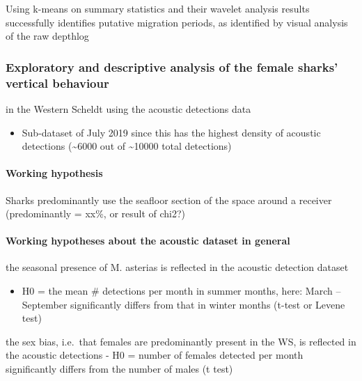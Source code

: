 \documentclass[
  authoryear,
  review,
  3p]{elsarticle}
\let\oldparagraph\paragraph
\renewcommand{\paragraph}[1]{\oldparagraph{#1}\mbox{}}
\providecommand{\tightlist}{%
  \setlength{\itemsep}{0pt}\setlength{\parskip}{0pt}}\usepackage{longtable,booktabs,array}
\begin{document}
Using k-means on summary statistics and their wavelet analysis results
successfully identifies putative migration periods, as identified by
visual analysis of the raw depthlog

\hypertarget{exploratory-and-descriptive-analysis-of-the-female-sharks-vertical-behaviour}{%
\subsubsection{Exploratory and descriptive analysis of the female
sharks' vertical
behaviour}\label{exploratory-and-descriptive-analysis-of-the-female-sharks-vertical-behaviour}}

in the Western Scheldt using the acoustic detections data

\begin{itemize}
\tightlist
\item
  Sub-dataset of July 2019 since this has the highest density of
  acoustic detections (\textasciitilde6000 out of \textasciitilde10000
  total detections)
\end{itemize}

\hypertarget{working-hypothesis-1}{%
\paragraph{Working hypothesis}\label{working-hypothesis-1}}

Sharks predominantly use the seafloor section of the space around a
receiver (predominantly = xx\%, or result of chi2?)

\hypertarget{working-hypotheses-about-the-acoustic-dataset-in-general}{%
\paragraph{Working hypotheses about the acoustic dataset in
general}\label{working-hypotheses-about-the-acoustic-dataset-in-general}}

the seasonal presence of M. asterias is reflected in the acoustic
detection dataset

\begin{itemize}
\tightlist
\item
  H0 = the mean \# detections per month in summer months, here: March --
  September significantly differs from that in winter months (t-test or
  Levene test)
\end{itemize}

the sex bias, i.e.~that females are predominantly present in the WS, is
reflected in the acoustic detections - H0 = number of females detected
per month significantly differs from the number of males (t test)
\end{document}
